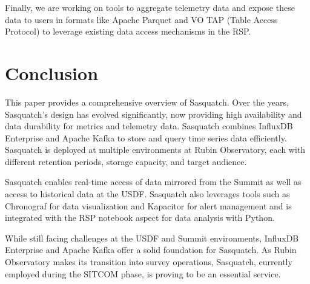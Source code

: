 Finally, we are working on tools to aggregate telemetry \cite{SQR-058} data and expose these data to users in formats like Apache Parquet and VO TAP (Table Access Protocol)\cite{2019ivoa.spec.0927D} to leverage existing data access mechanisms in the RSP.

\section{Conclusion}
\label{sec:conc}

This paper provides a comprehensive overview of Sasquatch. Over the years, Sasquatch's design has evolved significantly, now providing high availability and data durability for metrics and telemetry data. Sasquatch combines InfluxDB Enterprise and Apache Kafka to store and query time series data efficiently. Sasquatch is deployed at multiple environments at Rubin Observatory, each with different retention periods, storage capacity, and target audience.

Sasquatch enables real-time access of data mirrored from the Summit as well as access to historical data at the USDF. Sasquatch also leverages tools such as Chronograf for data visualization and Kapacitor for alert management and is integrated with the RSP notebook aspect for data analysis with Python.

While still facing challenges at the USDF and Summit environments, InfluxDB Enterprise and Apache Kafka offer a solid foundation for Sasquatch. As Rubin Observatory makes its transition into survey operations, Sasquatch, currently employed during the SITCOM phase, is proving to be an essential service.

\vskip 0.4in
